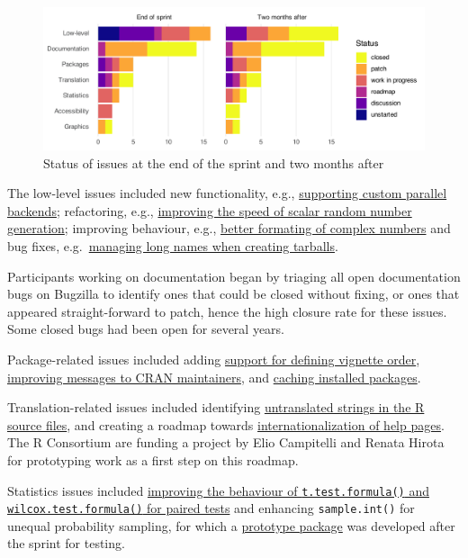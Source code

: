 \begin{figure}
\includegraphics[width=1\linewidth]{figures/bug_review} \caption{Status of issues at the end of the sprint and two months after}\label{fig:issues}
\end{figure}

The low-level issues included new functionality, e.g., \href{https://bugs.r-project.org/show_bug.cgi?id=18587}{supporting custom parallel backends}; refactoring, e.g.,
\href{https://bugs.r-project.org/show_bug.cgi?id=18600}{improving the speed of scalar random number generation}; improving behaviour, e.g., \href{https://bugs.r-project.org/show_bug.cgi?id=16752}{better formating of complex numbers} and bug fixes, e.g.~\href{https://bugs.r-project.org/show_bug.cgi?id=17871}{managing long names when creating tarballs}.

Participants working on documentation began by triaging all open documentation bugs on Bugzilla to identify ones that could be closed without fixing, or ones that appeared straight-forward to patch, hence the high closure rate for these issues. Some closed bugs had been open for several years.

Package-related issues included adding \href{https://bugs.r-project.org/show_bug.cgi?id=18576}{support for defining vignette order}, \href{https://github.com/r-devel/r-project-sprint-2023/issues/55}{improving messages to CRAN maintainers}, and \href{https://github.com/r-devel/r-project-sprint-2023/issues/78}{caching installed packages}.

Translation-related issues included identifying \href{https://bugs.r-project.org/show_bug.cgi?id=17819}{untranslated strings in the
R source files}, and creating
a roadmap towards \href{https://github.com/r-devel/r-project-sprint-2023/issues/35}{internationalization of help pages}. The R Consortium are funding a project by Elio Campitelli and Renata Hirota for prototyping work as a first step on this roadmap.

Statistics issues included \href{https://bugs.r-project.org/show_bug.cgi?id=14359}{improving the behaviour of \texttt{t.test.formula()} and \texttt{wilcox.test.formula()} for paired tests} and enhancing
\texttt{sample.int()} for unequal probability sampling, for which a \href{https://github.com/dickoa/sondage}{prototype package} was developed after the sprint for testing.

